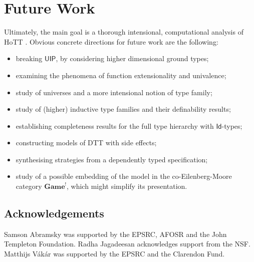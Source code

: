 \documentclass[runningheads,a4paper]{llncs}
\newcommand{\Gamecat}{\mathbf{Game}}
\begin{document}
\section{Future Work}\vspace{-7pt}
Ultimately, the main goal is a thorough intensional, computational analysis of HoTT \cite{hottbook}. Obvious concrete directions for future work are the following:\vspace{-2pt}
\begin{itemize}
\item breaking $\mathsf{UIP}$, by considering higher dimensional ground types; 
\item examining the phenomena of function extensionality and univalence;
\item study of universes and a more intensional notion of type family;
\item study of (higher) inductive type families and their definability results;
\item establishing completeness results for the full type hierarchy with $\mathsf{Id}$-types;
\item constructing models of \textsf{DTT} with side effects;
\item synthesising strategies from a dependently typed specification;
\item study of a possible embedding of the model in the co-Eilenberg-Moore category $\Gamecat^!$, which might simplify its presentation.
\end{itemize}
\vspace{-3pt}
\subsection*{Acknowledgements}
\vspace{-3pt}
Samson Abramsky was supported by the EPSRC, AFOSR and the John Templeton Foundation.
Radha Jagadeesan acknowledges support from the NSF. Matthijs V\'ak\'ar was supported by the EPSRC and the Clarendon Fund.

\scriptsize


\end{document}

